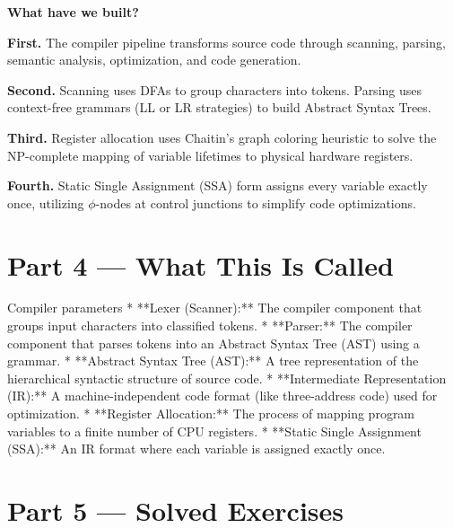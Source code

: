 \documentclass[12pt, a4paper]{book}
\begin{document}
\begin{discoverybox}
\textbf{What have we built?}

\textbf{First.} The compiler pipeline transforms source code through scanning, parsing, semantic analysis, optimization, and code generation.

\textbf{Second.} Scanning uses DFAs to group characters into tokens. Parsing uses context-free grammars (LL or LR strategies) to build Abstract Syntax Trees.

\textbf{Third.} Register allocation uses Chaitin's graph coloring heuristic to solve the NP-complete mapping of variable lifetimes to physical hardware registers.

\textbf{Fourth.} Static Single Assignment (SSA) form assigns every variable exactly once, utilizing $\phi$-nodes at control junctions to simplify code optimizations.
\end{discoverybox}

\newpage

\section{Part 4 --- What This Is Called}

\begin{namedconcept}{Compiler parameters}
* **Lexer (Scanner):** The compiler component that groups input characters into classified tokens.
* **Parser:** The compiler component that parses tokens into an Abstract Syntax Tree (AST) using a grammar.
* **Abstract Syntax Tree (AST):** A tree representation of the hierarchical syntactic structure of source code.
* **Intermediate Representation (IR):** A machine-independent code format (like three-address code) used for optimization.
* **Register Allocation:** The process of mapping program variables to a finite number of CPU registers.
* **Static Single Assignment (SSA):** An IR format where each variable is assigned exactly once.
\end{namedconcept}

\newpage

\section{Part 5 --- Solved Exercises}
\end{document}
